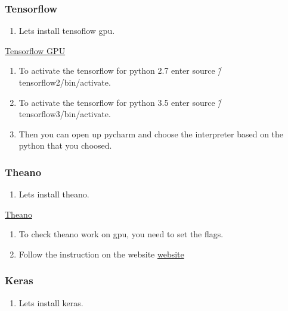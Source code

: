 \documentclass[12pt]{article}
\begin{document}
\subsubsection{Tensorflow}

\begin{enumerate}[resume]
  \item Lets install tensoflow gpu.
\end{enumerate}

\begin{center}
\href{run:./Text_Files_16/tensorflow.txt}{\Large Tensorflow GPU}
\end{center}

\begin{enumerate}[resume]
  \item To activate the tensorflow for python 2.7 enter source \~/tensorflow2/bin/activate.
  \item To activate the tensorflow for python 3.5 enter source \~/tensorflow3/bin/activate.
  \item Then you can open up pycharm and choose the interpreter based on the python that you choosed.
\end{enumerate}

\subsubsection{Theano}

\begin{enumerate}[resume]
  \item Lets install theano.
\end{enumerate}

\begin{center}
\href{run:./Text_Files_16/Theano.txt}{\Large Theano}
\end{center}

\begin{enumerate}[resume]
  \item To check theano work on gpu, you need to set the flags.
  \item Follow the instruction on the website \href{http://theano.readthedocs.io/en/0.8.x/tutorial/using_gpu.html}{website}
\end{enumerate}

\subsubsection{Keras}

\begin{enumerate}[resume]
  \item Lets install keras.
\end{enumerate}
\end{document}
